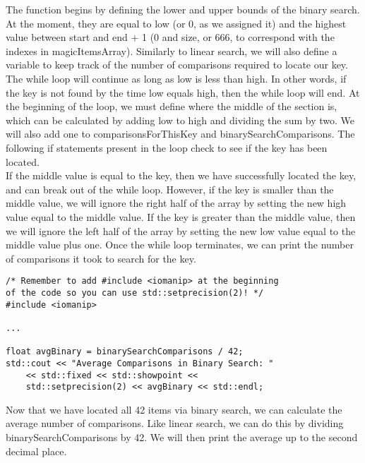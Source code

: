\documentclass{article}
\begin{document}
The function begins by defining the lower and upper bounds of the binary search. At the moment, they are equal to low (or 0, as we assigned it) and the highest value between start and end + 1 (0 and size, or 666, to correspond with the indexes in magicItemsArray). Similarly to linear search, we will also define a variable to keep track of the number of comparisons required to locate our key. \\
The while loop will continue as long as low is less than high. In other words, if the key is not found by the time low equals high, then the while loop will end. At the beginning of the loop, we must define where the middle of the section is, which can be calculated by adding low to high and dividing the sum by two. We will also add one to comparisonsForThisKey and binarySearchComparisons. The following if statements present in the loop check to see if the key has been located. \\
If the middle value is equal to the key, then we have successfully located the key, and can break out of the while loop. However, if the key is smaller than the middle value, we will ignore the right half of the array by setting the new high value equal to the middle value. If the key is greater than the middle value, then we will ignore the left half of the array by setting the new low value equal to the middle value plus one.
Once the while loop terminates, we can print the number of comparisons it took to search for the key. \\

\begin{lstlisting}
/* Remember to add #include <iomanip> at the beginning 
of the code so you can use std::setprecision(2)! */
#include <iomanip>

...

float avgBinary = binarySearchComparisons / 42;
std::cout << "Average Comparisons in Binary Search: " 
    << std::fixed << std::showpoint << 
    std::setprecision(2) << avgBinary << std::endl;
\end{lstlisting}

Now that we have located all 42 items via binary search, we can calculate the average number of comparisons. Like linear search, we can do this by dividing binarySearchComparisons by 42. We will then print the average up to the second decimal place.
\end{document}
